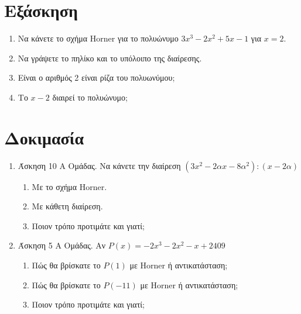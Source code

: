 \documentclass[a4paper,12pt]{article}
\begin{document}
 \hspace{1cm}
\hspace{1cm}
\hspace{1cm}\vspace{1cm}

\hspace{1cm}
\hspace{1cm}


\section{Εξάσκηση}

\begin{enumerate}
  \item Να κάνετε το σχήμα Horner για το πολυώνυμο $3x^3-2x^2+5x-1$ για $x = 2$.
        \vspace{3cm}
  \item Να γράψετε το πηλίκο και το υπόλοιπο της διαίρεσης.

        \vspace{1cm}
        \dotfill
  \item Είναι ο αριθμός 2 είναι ρίζα του πολυωνύμου;
  \item Το $x-2$ διαιρεί το πολυώνυμο;
\end{enumerate}

\section{Δοκιμασία}

\begin{enumerate}
  \item Άσκηση 10 Α Ομάδας. Να κάνετε την διαίρεση $(3x^2 - 2αx - 8α^2): (x - 2α)$
        \begin{enumerate}
          \item Με το σχήμα Horner.
          \item Με κάθετη διαίρεση.
          \item Ποιον τρόπο προτιμάτε και γιατί;
        \end{enumerate}
  \item Άσκηση 5 Α Ομάδας. Αν $P(x) = -2x^3 - 2x^2 - x + 2409$
        \begin{enumerate}
          \item Πώς θα βρίσκατε το $P(1)$ με Horner ή αντικατάσταση;
          \item Πώς θα βρίσκατε το $P(-11)$ με Horner ή αντικατάσταση;
          \item Ποιον τρόπο προτιμάτε και γιατί;
        \end{enumerate}
\end{enumerate}
\end{document}
